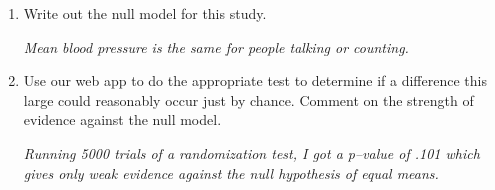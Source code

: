 \begin{enumerate}
\begin{enumerate}
\begin{key}
  {\it 2.625}
\end{key}
     \item  Write out the null model for this study.
\begin{students}
  \vspace*{\fill}
\end{students} 

\begin{key}
  {\it Mean blood pressure is the same for people talking or counting.}
\end{key}
     \item  Use our web app to do the appropriate test to determine if a
       difference this large could reasonably occur just by chance.
       Comment on the strength of evidence against
       the null model.
\begin{students}
  \vspace*{\fill}
\end{students} 


\begin{key}
  {\it Running 5000 trials of a randomization test, I got a p--value of
    .101 which gives only weak evidence against the null hypothesis of
    equal means.}
\end{key}
     \end{enumerate}
     
\begin{students}
\newpage
\end{students}





\end{enumerate}

